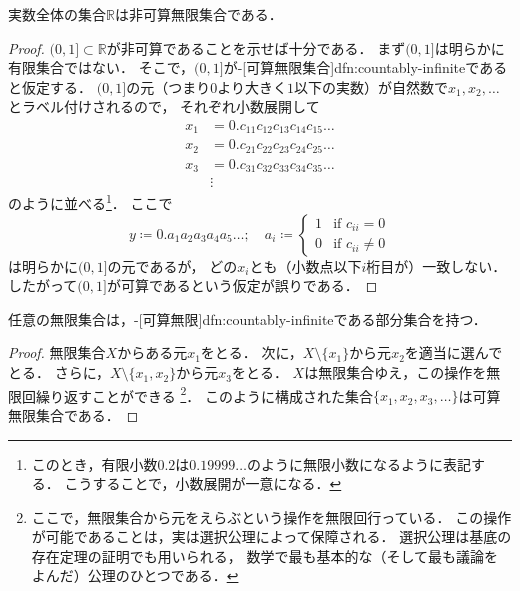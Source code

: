 \documentclass[../sotsu.tex]{subfiles}
\begin{document}
\begin{theorem}
    実数全体の集合$ℝ$は非可算無限集合である\cite[\S 7]{uchida-set-2020}．
\end{theorem}

\begin{proof}
    $(0, 1] \subset ℝ$が非可算であることを示せば十分である．
    まず$(0, 1]$は明らかに有限集合ではない．
    そこで，$(0, 1]$が-[可算無限集合]{dfn:countably-infinite}であると仮定する．
    $(0, 1]$の元（つまり$0$より大きく$1$以下の実数）が自然数で$x_1, x_2, \dotsc$とラベル付けされるので，
    それぞれ小数展開して
    \begin{align*}
        x_1 &= 0.c_{11}c_{12}c_{13}c_{14}c_{15}\dotso \\
        x_2 &= 0.c_{21}c_{22}c_{23}c_{24}c_{25}\dotso \\
        x_3 &= 0.c_{31}c_{32}c_{33}c_{34}c_{35}\dotso \\
        &\vdots 
    \end{align*}
    のように並べる\footnote{
        このとき，有限小数$0.2$は$0.19999\dotso$のように無限小数になるように表記する．
        こうすることで，小数展開が一意になる\cite[\S 7]{uchida-set-2020}．
    }．
    ここで
    \begin{equation*}
        y \coloneq 0. a_1 a_2 a_3 a_4 a_5 \dotso;
            \quad a_i \coloneq
            \begin{cases}
                1  &  \text{if } c_{ii}   =  0  \\
                0  &  \text{if } c_{ii} \neq 0
            \end{cases}
    \end{equation*}
    は明らかに$(0, 1]$の元であるが，
    どの$x_i$とも（小数点以下$i$桁目が）一致しない．
    したがって$(0, 1]$が可算であるという仮定が誤りである\cite[\S 7]{uchida-set-2020}．
\end{proof}



\begin{proposition}
    \label{thm:countable-subset}
    任意の無限集合は，-[可算無限]{dfn:countably-infinite}である部分集合を持つ．
\end{proposition}

\begin{proof}
    無限集合$X$からある元$x_1$をとる．
    次に，$X \setminus \{ x_1 \}$から元$x_2$を適当に選んでとる．
    さらに，$X \setminus \{ x_1, x_2 \}$から元$x_3$をとる．
    $X$は無限集合ゆえ，この操作を無限回繰り返すことができる%
    \footnote{
        ここで，無限集合から元をえらぶという操作を無限回行っている．
        この操作が可能であることは，実は選択公理によって保障される．
        選択公理は基底の存在定理の証明でも用いられる，
        数学で最も基本的な（そして最も議論をよんだ）公理のひとつである．
    }．
    このように構成された集合$\{ x_1, x_2, x_3, \dotsc \}$は可算無限集合である．
\end{proof}
\end{document}
